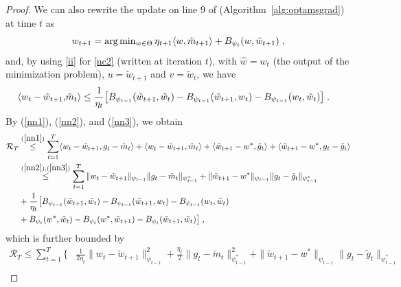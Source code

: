 \documentclass[wcp]{jmlr}
\begin{document}
\begin{proof}
We can also rewrite the update on line 9 of (Algorithm~\ref{alg:optamsgrad}) at time $t$ as
\begin{equation} \label{nc2}
\textstyle w_{t+1} = \arg\min_{w \in \Theta} \eta_{t+1} \langle w, \tilde{m}_{t+1} \rangle + B_{\psi_t}(w, \tilde{w}_{t+1} ) \eqsp.
\end{equation}
and, by using \eqref{ii} for \eqref{nc2} (written at iteration $t$), with $\hat{w} = w_{t}$ (the output of the minimization problem), $u = \tilde{w}_{t+1}$ and $v = \tilde{w}_{t}$, we have
\begin{equation} \label{nn3}
\begin{aligned}
\langle w_t -\tilde{w}_{t+1}, & \tilde{m}_t  \rangle \leq \frac{1}{\eta_t}\big[ B_{\psi_{t-1}}(\tilde{w}_{t+1}, \tilde{w}_{t}) - B_{\psi_{t-1}}(\tilde{w}_{t+1}, w_t ) - B_{\psi_{t-1}}(w_{t}, \tilde{w}_{t}) \big] \eqsp.
\end{aligned}
\end{equation}
By (\ref{nn1}), (\ref{nn2}), and (\ref{nn3}), we obtain
\begin{equation} \label{nnn}
\begin{aligned}
 \mathcal{R}_T & \overset{(\ref{nn1})}{\leq} \sum_{t=1}^T \langle  w_t - \tilde{w}_{t+1} , g_t - \tilde{m}_t \rangle + \langle w_t - \tilde{w}_{t+1}, \tilde{m}_t \rangle + \langle \tilde{w}_{t+1} - w^*, \tilde{g}_t  \rangle+ \langle \tilde{w}_{t+1} - w^*,g_t - \tilde{g}_t  \rangle \\
& \overset{(\ref{nn2}), (\ref{nn3})}{\leq}  \sum_{t=1}^T \| w_t - \tilde{w}_{t+1} \|_{\psi_{t-1}} \| g_t - \tilde{m}_t  \|_{\psi_{t-1}^*} + \|  \tilde{w}_{t+1} - w^* \|_{\psi_{t-1}} \| g_t - \tilde{g}_t  \|_{\psi_{t-1}^*}\\
&+ \frac{1}{\eta_t} \big[ B_{\psi_{t-1}}(\tilde{w}_{t+1}, \tilde{w}_{t}) - B_{\psi_{t-1}}(\tilde{w}_{t+1}, w_t ) - B_{\psi_{t-1}}(w_{t}, \tilde{w}_{t}) \\
& +  B_{\psi_t}( w^*, \tilde{w}_{t}) -B_{\psi_t}(w^*,  \tilde{w}_{t+1} ) - B_{\psi_t}(\tilde{w}_{t+1}, \tilde{w}_{t}) \big] \eqsp,
\end{aligned}
\end{equation}
which is further bounded by
\begin{equation} \label{nnnn}
\begin{aligned}
  \mathcal{R}_T \leq \sum_{t=1}^T \Big\{  & \frac{1}{2 \eta_t} \| w_t - \tilde{w}_{t+1} \|_{\psi_{t-1}}^2 + \frac{\eta_t}{2} \| g_t -\tilde{m}_t  \|_{\psi_{t-1}^*}^2+ \|  \tilde{w}_{t+1} - w^* \|_{\psi_{t-1}} \| g_t - \tilde{g}_t  \|_{\psi_{t-1}^*}\\\

\end{aligned}
\end{equation}
\end{proof}
\end{document}
